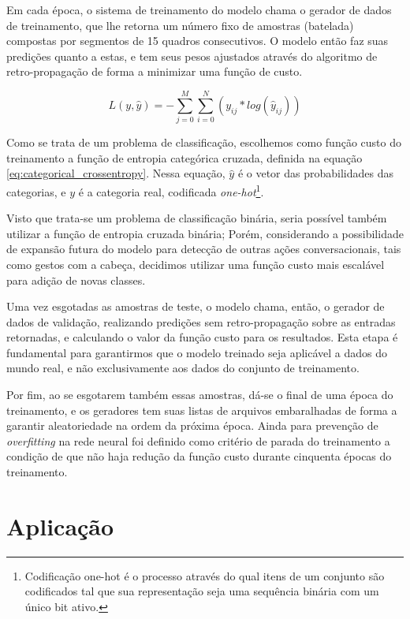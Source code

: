 Em cada época, o sistema de treinamento do modelo chama o gerador de dados de treinamento, que lhe retorna um número fixo de amostras (batelada) compostas por segmentos de 15 quadros consecutivos.
O modelo então faz suas predições quanto a estas, e tem seus pesos ajustados através do algoritmo de retro-propagação de forma a minimizar uma função de custo.

\begin{equation} \label{eq:categorical_crossentropy}
    L(y,\hat{y})=-\sum\limits_{j=0}^M\sum\limits_{i=0}^N(y_{ij}*log(\hat{y}_{ij}))
\end{equation}

Como se trata de um problema de classificação, escolhemos como função custo do treinamento a função de entropia categórica cruzada, definida na equação \ref{eq:categorical_crossentropy}. Nessa equação, $\hat{y}$ é o vetor das probabilidades das categorias, e $y$ é a categoria real, codificada \textit{one-hot}\footnote{Codificação one-hot é o processo através do qual itens de um conjunto são codificados tal que sua representação seja uma sequência binária com um único bit ativo.}.

Visto que trata-se um problema de classificação binária, seria possível também utilizar a função de entropia cruzada binária; Porém, considerando a possibilidade de expansão futura do modelo para detecção de outras ações conversacionais, tais como gestos com a cabeça, decidimos utilizar uma função custo mais escalável para adição de novas classes.

Uma vez esgotadas as amostras de teste, o modelo chama, então, o gerador de dados de validação, realizando predições sem retro-propagação sobre as entradas retornadas, e calculando o valor da função custo para os resultados.
Esta etapa é fundamental para garantirmos que o modelo treinado seja aplicável a dados do mundo real, e não exclusivamente aos dados do conjunto de treinamento.

Por fim, ao se esgotarem também essas amostras, dá-se o final de uma época do treinamento, e os geradores tem suas listas de arquivos embaralhadas de forma a garantir aleatoriedade na ordem da próxima época.
Ainda para prevenção de \textit{overfitting} na rede neural foi definido como critério de parada do treinamento a condição de que não haja redução da função custo durante cinquenta épocas do treinamento.

\section{Aplicação}
\label{sec:application}
